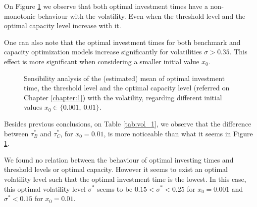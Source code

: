 On Figure \ref{fig:vol_1} we observe that both optimal investment times have a non-monotonic behaviour with the volatility. Even when the threshold level and the optimal capacity level increase with it.

One can also note that the optimal investment times for both benchmark and capacity optimization models increase significantly for volatilities $\sigma>0.35$. This effect is more significant when considering a smaller initial value $x_0$.

\begin{figure}[!ht]
	\begin{subfigmatrix}{3}
	\end{subfigmatrix}
	\caption{Sensibility analysis of the (estimated) mean of optimal investment time, the threshold level and the optimal capacity level (referred on Chapter \ref{chapter:1}) with the volatility, regarding different initial values $x_0 \in \{0.001, \ 0.01\}$.}
	\label{fig:vol_1}
\end{figure}

Besides previous conclusions, on Table \ref{tab:vol_1}, we observe that the difference between $\tau_B^*$ and $\tau_C^*$, for $x_0=0.01$, is more noticeable than what it seems in Figure \ref{fig:vol_1}.

We found no relation between the behaviour of optimal investing times and threshold levels or optimal capacity. However it seems to exist an optimal volatility level such that the optimal investment time is the lowest. In this case, this optimal volatility level $\sigma^*$ seems to be $0.15 < \sigma^* < 0.25$ for $x_0=0.001$ and $\sigma^*<0.15$ for $x_0=0.01$.

